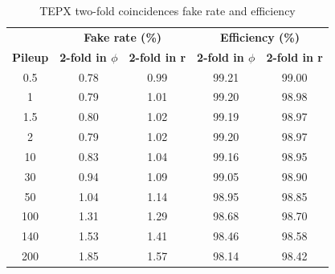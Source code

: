   
\begin{table}[H]
  \centering
  \caption{TEPX two-fold coincidences fake rate and efficiency}
  \begin{tabular}{ccccc}
    & \multicolumn{2}{c}{\textbf{Fake rate (\%)}} & \multicolumn{2}{c}{\textbf{Efficiency (\%)}} \\
    \textbf{Pileup}  & \textbf{2-fold in $\phi$} & \textbf{2-fold in r} & \textbf{2-fold in $\phi$} & \textbf{2-fold in r} \\
    \hline
    0.5  & 0.78 & 0.99 & 99.21 & 99.00 \\
    1    & 0.79 & 1.01 & 99.20 & 98.98 \\
    1.5  & 0.80 & 1.02 & 99.19 & 98.97 \\
    2    & 0.79 & 1.02 & 99.20 & 98.97 \\
    10   & 0.83 & 1.04 & 99.16 & 98.95 \\
    30   & 0.94 & 1.09 & 99.05 & 98.90 \\
    50   & 1.04 & 1.14 & 98.95 & 98.85 \\
    100  & 1.31 & 1.29 & 98.68 & 98.70 \\
    140  & 1.53 & 1.41 & 98.46 & 98.58 \\
    200  & 1.85 & 1.57 & 98.14 & 98.42 \\
  \end{tabular}
  \label{tab:combined_sample}
\end{table}


